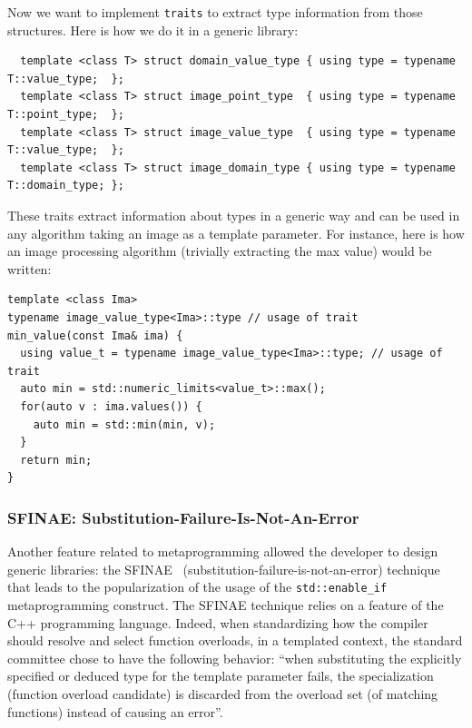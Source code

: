 Now we want to implement \texttt{traits} to extract type information from those structures. Here is how we do it in a
generic library:

\begin{verbatim}
  template <class T> struct domain_value_type { using type = typename T::value_type;  };
  template <class T> struct image_point_type  { using type = typename T::point_type;  };
  template <class T> struct image_value_type  { using type = typename T::value_type;  };
  template <class T> struct image_domain_type { using type = typename T::domain_type; };
\end{verbatim}

These traits extract information about types in a generic way and can be used in any algorithm taking an image as a
template parameter. For instance, here is how an image processing algorithm (trivially extracting the max value) would
be written:

\begin{verbatim}
template <class Ima>
typename image_value_type<Ima>::type // usage of trait
min_value(const Ima& ima) {
  using value_t = typename image_value_type<Ima>::type; // usage of trait
  auto min = std::numeric_limits<value_t>::max();
  for(auto v : ima.values()) {
    auto min = std::min(min, v);
  }
  return min;
}
\end{verbatim}

\subsubsection{SFINAE: Substitution-Failure-Is-Not-An-Error}
\label{subsec:sfinae}

Another feature related to metaprogramming allowed the developer to design generic libraries: the
SFINAE~\parencite{vandevoorde.2002.c++} (substitution-failure-is-not-an-error) technique that leads to the
popularization of the usage of the \texttt{std::enable\_if} metaprogramming construct. The SFINAE technique relies on a
feature of the C++ programming language. Indeed, when standardizing how the compiler should resolve and select function
overloads, in a templated context, the standard committee chose to have the following behavior: ``when substituting the
explicitly specified or deduced type for the template parameter fails, the specialization (function overload candidate)
is discarded from the overload set (of matching functions) instead of causing an error''.

